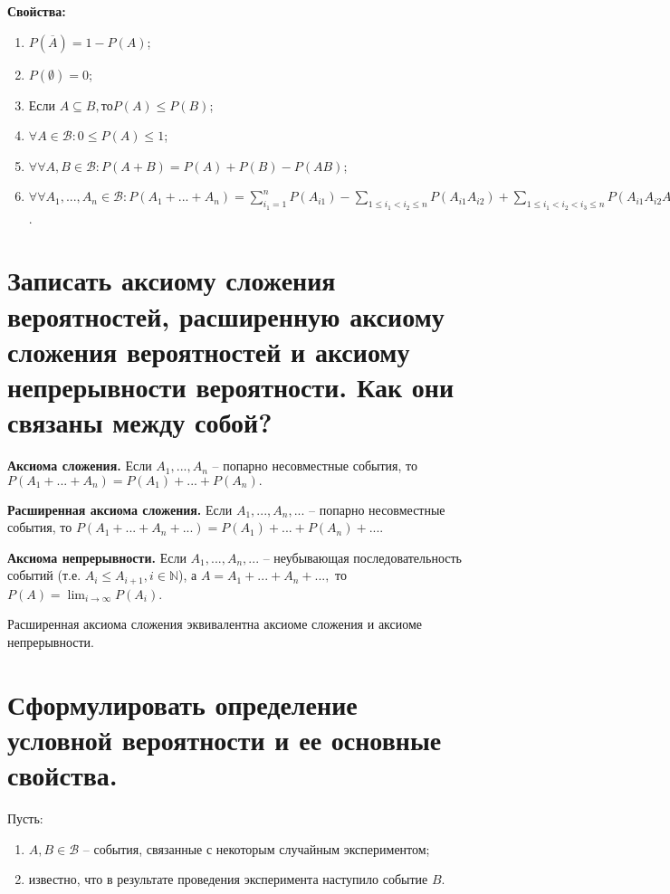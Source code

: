 \textbf{Свойства:}
\begin{enumerate}
	\item $P(\overline{A}) =  1 - P(A)$;
	\item $P(\emptyset) = 0$;
	\item Если $A \subseteq B, \text{то} P(A) \leq P(B)$;
	\item $\forall A \in \mathcal{B}: 0 \leq P(A) \leq 1$;
	\item $\forall \forall A, B \in \mathcal{B}: P(A + B) = P(A) + P(B) - P(AB)$;
	\item $\forall \forall A_1, ..., A_n \in \mathcal{B}: P(A_1 + ... + A_n) = \sum_{i_1=1}^n P(A_{i1}) - \sum_{1 \leq i_1 < i_2 \leq n} P(A_{i1}A_{i2}) + \sum_{1 \leq i_1 < i_2 < i_3 \leq n} P(A_{i1}A_{i2}A_{i3}) - ... + (-1)^{n-1}P(A_1 ... A_n)$.
\end{enumerate}

\section{Записать аксиому сложения вероятностей, расширенную аксиому сложения вероятностей и аксиому непрерывности вероятности. Как они связаны между собой?}

\textbf{Аксиома сложения.} Если $A_1, ..., A_n$ -- попарно несовместные события, то $P(A_1 + ... + A_n) = P(A_1) + ... + P(A_n).$

\textbf{Расширенная аксиома сложения.} Если $A_1, ..., A_n, ...$ -- попарно несовместные события, то $P(A_1 + ... + A_n + ...) = P(A_1) + ... + P(A_n) + ...$.

\textbf{Аксиома непрерывности.} Если $A_1, ..., A_n, ...$ -- неубывающая последовательность событий (т.е. $A_i \leq A_{i + 1}, i \in  \mathbb{N}$), а $A = A_1 + ... + A_n + ... ,$ то $P(A) = \lim_{i \to \infty} P(A_i)$.

Расширенная аксиома сложения эквивалентна аксиоме сложения и аксиоме непрерывности.

\section{Сформулировать определение условной вероятности и ее основные свойства.}

Пусть:
\begin{enumerate}
	\item $A, B \in \mathcal{B}$ -- события, связанные с некоторым случайным экспериментом;
	\item известно, что в результате проведения эксперимента наступило событие $B$.
\end{enumerate}

